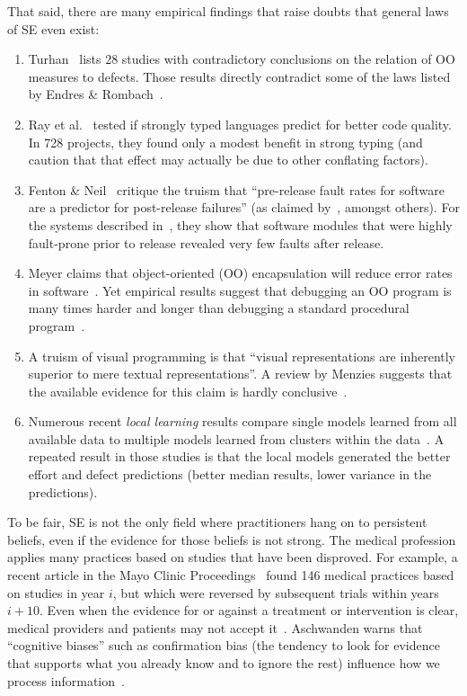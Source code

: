 \documentclass[smallcondesed]{svjour3}
\newcommand{\be}{\begin{enumerate}}
\newcommand{\ee}{\end{enumerate}}
\begin{document}
That said, there are many empirical  findings that 
raise doubts that   general laws of SE even exist:
\be
\item
Turhan~\cite{me12d} lists 28 studies with contradictory conclusions
on the relation of OO measures to defects.  Those results
 directly  contradict some of the laws listed by 
Endres \& Rombach~\cite{endres03}.
\item
Ray et al.~\cite{ray2014lang} tested if   strongly typed languages
predict for better code quality. In  728 projects,
they found  only a modest benefit in strong typing
(and caution that that effect may actually be due to other  conflating factors).
\item
Fenton \& Neil~\cite{fenton00,fenton00b}   critique the truism that
``pre-release fault rates for software
are a predictor for post-release failures'' (as claimed by~\cite{dunsmore88},
amongst others). For the systems described in~\cite{fenton97}, they
show that software modules that were highly fault-prone
prior to release revealed very few faults after release.
\item
Meyer claims that   object-oriented (OO) encapsulation will
reduce error rates in software~\cite{Meyer1988}.  Yet empirical results suggest
that debugging an OO program is many times harder and
longer than debugging a standard procedural program~\cite{hatton98}.
\item
A truism of visual programming is that ``visual
representations are inherently superior to mere textual representations''. A review by Menzies suggests that the available
evidence for this claim is hardly conclusive~\cite{me00v}. 
\item
Numerous recent {\em local learning} results compare single models
learned from all available data to multiple models learned from clusters within the data~\cite{betten14,yang11,yang13,minku13,me12d,me11m,betta12,posnett11}.
A repeated result in those studies is that the local models generated the better effort
and defect predictions (better median results,
lower variance in the predictions).
\ee
 
To be fair, 
SE is  not the only
field where practitioners hang on to persistent beliefs, even if the evidence
for those beliefs is not strong.
The medical profession applies  many practices based on studies
that have been disproved. For example,
a  recent article
in the Mayo Clinic Proceedings~\cite{prasad13} found  
146 medical practices based on studies 
in year $i$, but which were  reversed by subsequent trials within years $i+10$.
Even when the evidence for or against a treatment or intervention is clear, medical providers and patients may not accept it~\cite{aschwanden10}.
Aschwanden warns that ``cognitive biases''  such as  confirmation bias (the tendency to look for evidence that supports what you already know and to ignore the rest)  influence how we process information~\cite{aschwanden15}.
\end{document}
